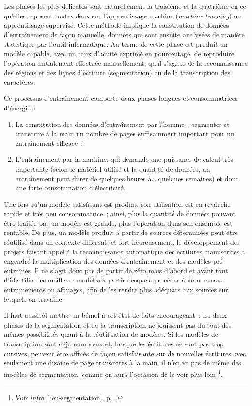 \documentclass[a4paper,12pt,twoside]{book}
\begin{document}
			Les phases les plus délicates sont naturellement la troisième et la quatrième en ce qu'elles reposent toutes deux sur l'apprentissage machine (\textit{machine learning}) ou apprentissage supervisé. Cette méthode implique la constitution de données d'entraînement de façon manuelle, données qui sont ensuite analysées de manière statistique par l'outil informatique. Au terme de cette phase est produit un modèle capable, avec un taux d'acuité exprimé en pourcentage, de reproduire l'opération initialement effectuée manuellement, qu'il s'agisse de la reconnaissance des régions et des lignes d'écriture (\gls{segmentation}) ou de la transcription des caractères.
			
			Ce processus d'entraînement comporte deux phases longues et consommatrices d'énergie~:
			
			\begin{enumerate}
				\item La constitution des données d'entraînement par l'homme~: segmenter et transcrire à la main un nombre de pages suffisamment important pour un entraînement efficace~;
				\item L'entraînement par la machine, qui demande une puissance de calcul très importante (selon le matériel utilisé et la quantité de données, un entraînement peut durer de quelques heures à… quelques semaines) et donc une forte consommation d'électricité.
			\end{enumerate}
			
			Une fois qu'un modèle satisfisant est produit, son utilisation est en revanche rapide et très peu consommatrice~; ainsi, plus la quantité de données pouvant être traitée par un modèle est grande, plus l'opération dans son ensemble est rentable. De plus, un modèle produit à partir de sources déterminées peut être réutilisé dans un contexte différent, et fort heureusement, le développement des projets faisant appel à la reconnaissance automatique des écritures manuscrites a engendré la multiplication des données d'entraînement et des modèles pré-entraînés. Il ne s'agit donc pas de partir de zéro mais d'abord et avant tout d'identifier les meilleurs modèles à partir desquels procéder à de nouveaux entraînements ou affinages, afin de les rendre plus adéquats aux sources sur lesquels on travaille.
			
			Il faut aussitôt mettre un bémol à cet état de faits encourageant~: les deux phases de la \gls{segmentation} et de la transcription ne jouissent pas du tout des mêmes possibilités quant à la réutilisation de modèles. Si les modèles de transcription sont déjà nombreux et, lorsque les écritures ne sont pas trop cursives, peuvent être affinés de façon satisfaisante sur de nouvelles écritures avec seulement une dizaine de page transcrites à la main, il n'en va pas de même des modèles de \gls{segmentation}, comme on aura l'occasion de le voir plus loin
			\footnote{Voir \textit{infra} \ref{lieu-segmentation}, p.~\pageref{lieu-segmentation}.}.
			
\end{document}
